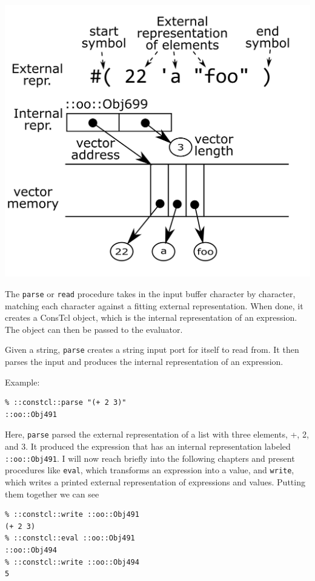 \documentclass[twoside,9pt]{report}
\begin{document}
\includegraphics{images/vector-representation.png}

The \texttt{parse} or \texttt{read} procedure takes in the input buffer character by character, matching each character against a fitting external representation. When done, it creates a ConsTcl object, which is the internal representation of an expression. The object can then be passed to the evaluator.


Given a string, \texttt{parse} creates a string input port for itself to read from. It then parses the input and produces the internal representation of an expression.


Example:

\begin{verbatim}
% ::constcl::parse "(+ 2 3)"
::oo::Obj491
\end{verbatim}


Here, \texttt{parse} parsed the external representation of a list with three elements, +, 2, and 3. It produced the expression that has an internal representation labeled \texttt{::oo::Obj491}. I will now reach briefly into the following chapters and present procedures like \texttt{eval}, which transforms an expression into a value, and \texttt{write}, which writes a printed external representation of expressions and values. Putting them together we can see

\begin{verbatim}
% ::constcl::write ::oo::Obj491
(+ 2 3)
% ::constcl::eval ::oo::Obj491
::oo::Obj494
% ::constcl::write ::oo::Obj494
5
\end{verbatim}
\end{document}
